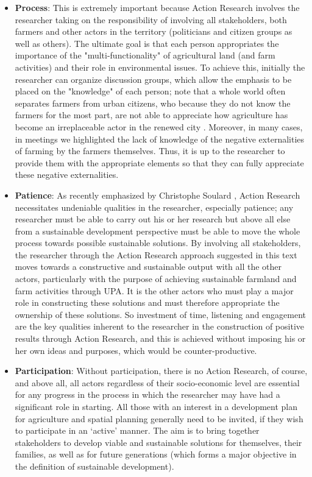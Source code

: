 \documentclass[10pt,a4paper]{article}
\begin{document}
\begin{multicols}{2}
\begin{itemize}[noitemsep,nolistsep]
\item \textbf{Process}: This is extremely important because Action Research involves the researcher taking on the responsibility of involving all stakeholders, both farmers and other actors in the territory (politicians and citizen groups as well as others). The ultimate goal is that each person appropriates the importance of the "multi-functionality" of agricultural land (and farm activities) and their role in environmental issues. To achieve this, initially the researcher can organize discussion groups, which allow the emphasis to be placed on the "knowledge" of each person; note that a whole world often separates farmers from urban citizens, who because they do not know the farmers for the most part, are not able to appreciate how agriculture has become an irreplaceable actor in the renewed city \citep{r17}. Moreover, in many cases, in meetings we highlighted the lack of knowledge of the negative externalities of farming by the farmers themselves. Thus, it is up to the researcher to provide them with the appropriate elements so that they can fully appreciate these negative externalities.
\item \textbf{Patience}: As recently emphasized by Christophe Soulard \citep{r18}, Action Research necessitates undeniable qualities in the researcher, especially patience; any researcher must be able to carry out his or her research but above all else from a sustainable development perspective must be able to move the whole process towards possible sustainable solutions. By involving all stakeholders, the researcher through the Action Research approach suggested in this text moves towards a constructive and sustainable output with all the other actors, particularly with the purpose of achieving sustainable farmland and farm activities through UPA. It is the other actors who must play a major role in constructing these solutions and must therefore appropriate the ownership of these solutions. So investment of time, listening and engagement are the key qualities inherent to the researcher in the construction of positive results through Action Research, and this is achieved without imposing his or her own ideas and purposes, which would be counter-productive.
\item \textbf{Participation}: Without participation, there is no Action Research, of course, and above all, all actors regardless of their socio-economic level are essential for any progress in the process in which the researcher may have had a significant role in starting. All those with an interest in a development plan for agriculture and spatial planning generally need to be invited, if they wish to participate in an `active' manner. The aim is to bring together stakeholders to develop viable and sustainable solutions for themselves, their families, as well as for future generations (which forms a major objective in the definition of sustainable development).
\end{itemize}


\end{multicols}
\end{document}
